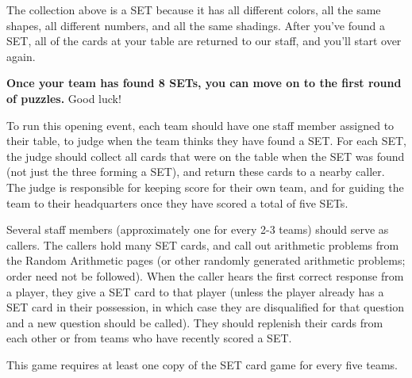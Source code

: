   The collection above is a SET because it has all different colors,
  all the same shapes, all different numbers, and all the same shadings.
  After you've found a SET, all of the cards at your table are returned
  to our staff, and you'll start over again.

  \textbf{Once your team has found 8 SETs, you can move on to the
  first round of puzzles.} Good luck!



\begin{multicols}{4}
\begin{itemize}
  
\end{itemize}
\end{multicols}



To run this opening event, each team should have one staff member assigned
to their table, to judge when the team thinks they have found a SET.
For each SET, the judge should collect all cards that were on the table when
the SET was found (not just the three forming a SET), and return these cards
to a nearby caller. The judge is responsible for keeping score for their own
team, and for guiding the team to their headquarters once they have scored
a total of five SETs.

Several staff members (approximately one for every 2-3 teams) should serve as
callers. The callers hold many SET cards, and call out arithmetic problems
from the Random Arithmetic pages (or other randomly generated arithmetic
problems; order need not be followed).
When the caller hears the first correct response from a player, they give a
SET card to that player (unless the player already has a SET card in their
possession, in which case they are disqualified for that question and a new
question should be called). They should replenish their cards from each other
or from teams who have recently scored a SET.

This game requires at least one copy of the SET card game for every five
teams.
